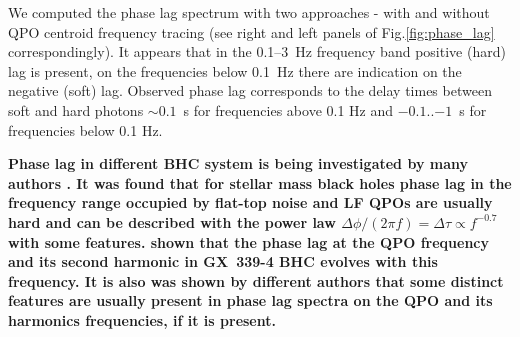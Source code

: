 \documentclass[a4paper,fleqn,usenatbib]{mnras}
\begin{document}
We computed the phase lag spectrum with two approaches - with and without QPO centroid frequency tracing (see right and left panels of Fig.\ref{fig:phase_lag} correspondingly).
It appears that in the 0.1--3~Hz frequency band positive (hard) lag is present, on the frequencies below 0.1~Hz there are indication on the negative (soft) lag.
Observed phase lag corresponds to the delay times between soft and hard photons $\sim0.1$~s for frequencies above 0.1 Hz and $-0.1$..$-1$~s for frequencies below 0.1 Hz.

{\bf 
Phase lag in different BHC system is being investigated by many authors \citep[see, e.g.][ and others]{1997ApJ...474L..43V, 2003A&A...407..335M, 2006A&A...449..703R, 2010MNRAS.407.2166G, 2011A&A...533A...8B, 2011MNRAS.415..292M, 2012MNRAS.427.2985C, 2013MNRAS.435.2132M, 2017MNRAS.465.1926Y, 2017MNRAS.471.1475D, 2017ApJ...845..143Z, 2017MNRAS.464.2643V, 2018MNRAS.473.4644R}.
It was found that for stellar mass black holes phase lag in the frequency range occupied by flat-top noise and LF QPOs are usually hard and can be described with the power law $\Delta  \phi /(2\pi f) = \Delta \tau \propto f^{-0.7}$ with some features. 
\citet{2017ApJ...845..143Z} shown that the phase lag at the QPO frequency and its second harmonic in GX~339-4 BHC evolves with this frequency. 
It is also was shown by different authors \citep[see, e.g.,][]{2013ApJ...778..136P, 2017ApJ...845..143Z} that some distinct features are usually present in phase lag spectra on the QPO and its harmonics frequencies, if it is present. 

}
\end{document}
